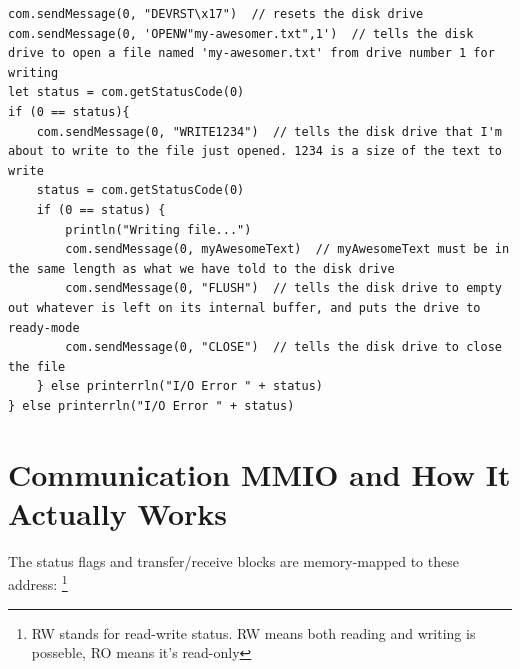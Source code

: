 \begin{lstlisting}
com.sendMessage(0, "DEVRST\x17")  // resets the disk drive
com.sendMessage(0, 'OPENW"my-awesomer.txt",1')  // tells the disk drive to open a file named 'my-awesomer.txt' from drive number 1 for writing
let status = com.getStatusCode(0)
if (0 == status){
	com.sendMessage(0, "WRITE1234")  // tells the disk drive that I'm about to write to the file just opened. 1234 is a size of the text to write
	status = com.getStatusCode(0)
	if (0 == status) {
		println("Writing file...")
		com.sendMessage(0, myAwesomeText)  // myAwesomeText must be in the same length as what we have told to the disk drive
		com.sendMessage(0, "FLUSH")  // tells the disk drive to empty out whatever is left on its internal buffer, and puts the drive to ready-mode
		com.sendMessage(0, "CLOSE")  // tells the disk drive to close the file
	} else printerrln("I/O Error " + status)
} else printerrln("I/O Error " + status)
\end{lstlisting}



\section{Communication MMIO and How It Actually Works}

The status flags and transfer/receive blocks are memory-mapped to these address:
\footnote{RW stands for read-write status. RW means both reading and writing is posseble, RO means it's read-only}



